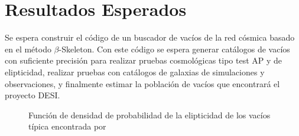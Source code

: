 \documentclass[preprint]{aastex62}
\begin{document}
  
  \section{Resultados Esperados}

  Se espera construir el código de un buscador de vacíos de la red cósmica basado en el
  método $\beta$-Skeleton. Con este código se espera generar catálogos de vacíos con
  suficiente precisión para realizar pruebas cosmológicas tipo test AP y de elipticidad,
  realizar pruebas con catálogos de galaxias de simulaciones y observaciones, y finalmente
  estimar la población de vacíos que encontrará el proyecto DESI.

  \begin{figure}
    \caption{ Función de densidad de probabilidad de la elipticidad de los vacíos típica
      encontrada por \citep{https://arxiv.org/pdf/0906.4101.pdf} \label{fig:expected_results}}
  \end{figure}


  \nocite{*}
\end{document}
